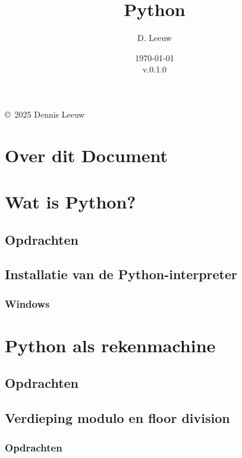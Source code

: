 \documentclass[a4paper,12pt,twoside,openright,titlepage]{book}
\author{D. Leeuw}
\title{Python}
\date{\today\\v.0.1.0}
\begin{document}

\maketitle

\copyright\ 2025 Dennis Leeuw\\




\frontmatter
\chapter{Over dit Document}
%
%

\tableofcontents

\mainmatter
\chapter{Wat is Python?}

\section{Opdrachten}

\section{Installatie van de Python-interpreter}
\subsection{Windows}


\chapter{Python als rekenmachine}

\section{Opdrachten}

\section{Verdieping modulo en floor division}

\subsection{Opdrachten}

\end{document}
